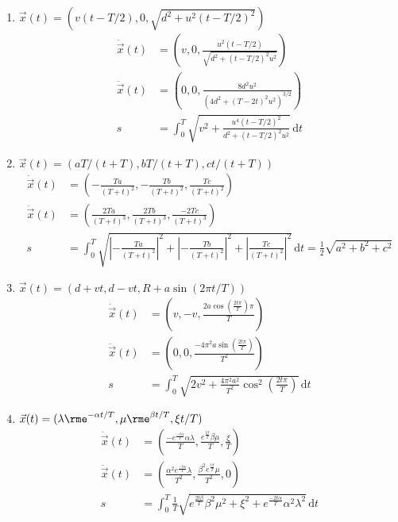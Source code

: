 \documentclass[11pt,answers]{exam}
\begin{document}
\begin{questions}
\begin{solution}
\begin{enumerate}
\item $\vec{x}(t)=(v(t-T/2),0,\sqrt{d^2+u^2(t-T/2)^2})$
\begin{align*}
\dot{\vec{x}}(t)&=\left(v,0,\frac{u^2(t-T/2)}{\sqrt{d^2+(t-T/2)^2u^2}}\right)
\\
\ddot{\vec{x}}(t)&=\left(0,0,\frac{8d^2u^2}{(4d^2+(T-2t)^2u^2)^{3/2}}\right)
\\
s&=\int_0^T\sqrt{v^2+\frac{u^4(t-T/2)^2}{d^2+(t-T/2)^2u^2}}\,\mathrm dt
\end{align*}
\item $\vec{x}(t)=(aT/(t+T),bT/(t+T),ct/(t+T))$
\begin{align*}
	\dot{\vec{x}}(t)&=\left( - \frac{T a}{\left( T + t \right)^{2}},  - \frac{T b}{\left( T + t \right)^{2}}, \frac{T c}{\left( T + t \right)^{2}}\right)\\
	\ddot{\vec{x}}(t)&=\left(\frac{2 T a}{\left( T + t \right)^{3}}, \frac{2 T b}{\left( T + t \right)^{3}}, \frac{ - 2 T c}{\left( T + t \right)^{3}} \right)\\
	s&=\int_0^T\sqrt{\left| - \frac{T a}{\left( T + t \right)^{2}}\right|^{2} + \left| - \frac{T b}{\left( T + t \right)^{2}}\right|^{2} + \left|\frac{T c}{\left( T + t \right)^{2}}\right|^{2}}\,\mathrm dt= \frac{1}{2}\sqrt{a^2+b^2+c^2}
\end{align*}
\item $\vec{x}(t)=(d+vt,d-vt,R+a\sin(2\pi t/T))$
\begin{align*}
	\dot{\vec{x}}(t)&=\left(v,  - v, \frac{2 a \cos\left( \frac{2 t \pi_{}}{T} \right) \pi_{}}{T} \right)\\
	\ddot{\vec{x}}(t)&=\left(0, 0, \frac{ - 4 \pi_{}^{2} a \sin\left( \frac{2 t \pi_{}}{T} \right)}{T^{2}} \right)\\
	s&=\int_0^T\sqrt{2 v^{2} + \frac{4 \pi^2 a^2}{T^2}\cos^2\left( \frac{2 t \pi_{}}{T} \right)}\,\mathrm dt
\end{align*}
\item $\vec{x}(t)=(\lambda\rme^{-\alpha t/T},\mu\rme^{\beta t/T},\xi t/T)$
\begin{align*}
	\dot{\vec{x}}(t)&=\left(\frac{ - e^{\frac{ - t \alpha}{T}} \alpha \lambda}{T}, \frac{e^{\frac{t \beta}{T}} \beta \mu}{T}, \frac{\xi}{T} \right)\\
	\ddot{\vec{x}}(t)&=\left(\frac{\alpha^{2} e^{\frac{ - t \alpha}{T}} \lambda}{T^{2}}, \frac{\beta^{2} e^{\frac{t \beta}{T}} \mu}{T^{2}}, 0 \right)\\
	s&=\int_0^T\frac{1}{T}\sqrt{e^{\frac{2 t \beta}{T}} \beta^2 \mu^2 + \xi^{2} + e^{\frac{ - 2 t \alpha}{T}} \alpha^2 \lambda^2}\,\mathrm dt

\end{align*}
\end{enumerate}
\end{solution}
\end{questions}
\end{document}
